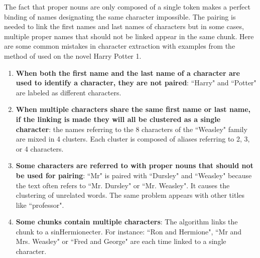 \documentclass[a4paper, 12pt]{report}
\begin{document}
The fact that proper nouns are only composed of a single token makes a perfect binding of names designating the same character impossible.
The pairing is needed to link the first names and last names of characters but in some cases, multiple proper names that should not be linked appear in the same chunk.
Here are some common mistakes in character extraction with examples from the method of \cite{original} used on the novel Harry Potter 1.
\begin{enumerate}
\item \textbf{When both the first name and the last name of a character are used to identify a character, they are not paired}: ``Harry" and ``Potter" are labeled as different characters.

\item \textbf{When multiple characters share the same first name or last name, if the linking is made they will all be clustered as a single character}: the names referring to the 8 characters of the ``Weasley" family are mixed in 4 clusters. Each cluster is composed of aliases referring to 2, 3, or 4 characters.

\item \textbf{Some characters are referred to with proper nouns that should not be used for pairing}: ``Mr" is paired with ``Dursley" and ``Weasley" because the text often refers to ``Mr. Dursley" or ``Mr. Weasley". It causes the clustering of unrelated words. The same problem appears with other titles like ``professor".

\item \textbf{Some chunks contain multiple characters}: The algorithm links the chunk to a sinHermionecter.
For instance: ``Ron and Hermione", ``Mr and Mrs. Weasley" or ``Fred and George" are each time linked to a single character.
\end{enumerate}
\end{document}

